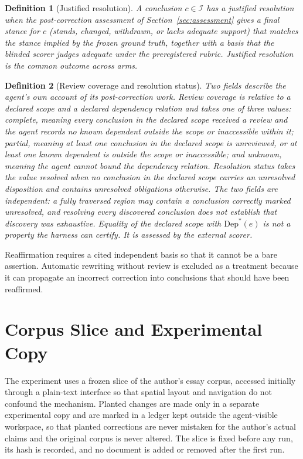 \documentclass[11pt]{article}
\newtheorem{definition}{Definition}
\newcommand{\Inv}{\mathcal{I}}
\newcommand{\Dep}{\mathrm{Dep}}
\begin{document}
\begin{definition}[Justified resolution]\label{def:jr}
A conclusion $c\in\Inv$ has a justified resolution when the post-correction assessment of Section~\ref{sec:assessment} gives a final stance for $c$ (stands, changed, withdrawn, or lacks adequate support) that matches the stance implied by the frozen ground truth, together with a basis that the blinded scorer judges adequate under the preregistered rubric. Justified resolution is the common outcome across arms.
\end{definition}

\begin{definition}[Review coverage and resolution status]
Two fields describe the agent's own account of its post-correction work. \emph{Review coverage} is relative to a declared scope and a declared dependency relation and takes one of three values: \emph{complete}, meaning every conclusion in the declared scope received a review and the agent records no known dependent outside the scope or inaccessible within it; \emph{partial}, meaning at least one conclusion in the declared scope is unreviewed, or at least one known dependent is outside the scope or inaccessible; and \emph{unknown}, meaning the agent cannot bound the dependency relation. \emph{Resolution status} takes the value \emph{resolved} when no conclusion in the declared scope carries an unresolved disposition and \emph{contains unresolved obligations} otherwise. The two fields are independent: a fully traversed region may contain a conclusion correctly marked unresolved, and resolving every discovered conclusion does not establish that discovery was exhaustive. Equality of the declared scope with $\Dep^{*}(e)$ is not a property the harness can certify. It is assessed by the external scorer.
\end{definition}

Reaffirmation requires a cited independent basis so that it cannot be a bare assertion. Automatic rewriting without review is excluded as a treatment because it can propagate an incorrect correction into conclusions that should have been reaffirmed.

\section{Corpus Slice and Experimental Copy}\label{sec:corpus}

The experiment uses a frozen slice of the author's essay corpus, accessed initially through a plain-text interface so that spatial layout and navigation do not confound the mechanism. Planted changes are made only in a separate experimental copy and are marked in a ledger kept outside the agent-visible workspace, so that planted corrections are never mistaken for the author's actual claims and the original corpus is never altered. The slice is fixed before any run, its hash is recorded, and no document is added or removed after the first run.
\end{document}

